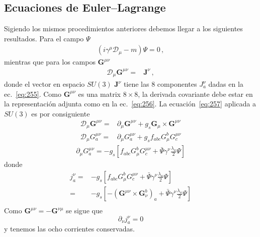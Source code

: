 \subsection{Ecuaciones de Euler--Lagrange}
\label{sec:ecuaciones-de-euler-1}
Sigiendo los mismos procedimientos anteriores debemos llegar a los siguientes resultados. Para el campo $\Psi$
\begin{align}
  (i\gamma^\mu\mathcal{D}_\mu-m)\Psi=0\,,
\end{align}
mientras que para los campos $\mathbf{G}^{\mu\nu}$
\begin{align}
  \mathcal{D}_\mu \mathbf{G}^{\mu\nu}=&\mathbf{J}^\nu\,,
\end{align}
donde el vector en espacio $SU(3)$ $\mathbf{J}^\nu$ tiene las 8 componentes $J^\nu_a$ dadas en la ec.~\eqref{eq:255}. Como $\mathbf{G}^{\mu\nu}$ es una matrix $8\times8$, la derivada covariante debe estar en la representaci\'on adjunta como en la ec.~\eqref{eq:256}. La ecuaci\'on~\eqref{eq:257} aplicada a $SU(3)$ es por consiguiente
\begin{align}
  \mathcal{D}_\mu \mathbf{G}^{\mu\nu}=&\partial_\mu\mathbf{G}^{\mu\nu}+g_s \mathbf{G}_\mu\times\mathbf{G}^{\mu\nu}\nonumber\\
  \mathcal{D}_\mu {G}^{\mu\nu}_a=&\partial_\mu{G}^{\mu\nu}_a+g_s f_{abc}{G}_\mu^b{G}^{\mu\nu}_c
\end{align}
\begin{align}
  \partial_\mu G^{\mu\nu}_a=-g_s\left[f_{abc}G^b_\mu G^{\mu\nu}_c+\bar{\Psi}\gamma^\nu\frac{\lambda_a}{2}\Psi  \right]
\end{align}
donde
\begin{align}
  j^\nu_a=&-g_s\left[f_{abc}G^b_\mu G^{\mu\nu}_c+\bar{\Psi}\gamma^\nu\frac{\lambda_a}{2}\Psi  \right]\nonumber\\
=&-g_s\left[-\left(\mathbf{G}^{\mu\nu}\times\mathbf{G}_\nu^b\right)_a+\bar{\Psi}\gamma^\nu\frac{\lambda_a}{2}\Psi  \right]\nonumber\\
\end{align}
Como $\mathbf{G}^{\mu\nu}=-\mathbf{G}^{\nu\mu}$ se sigue que
\begin{equation}
  \partial_\nu j^\nu_a=0
\end{equation}
y tenemos las ocho corrientes conservadas.


